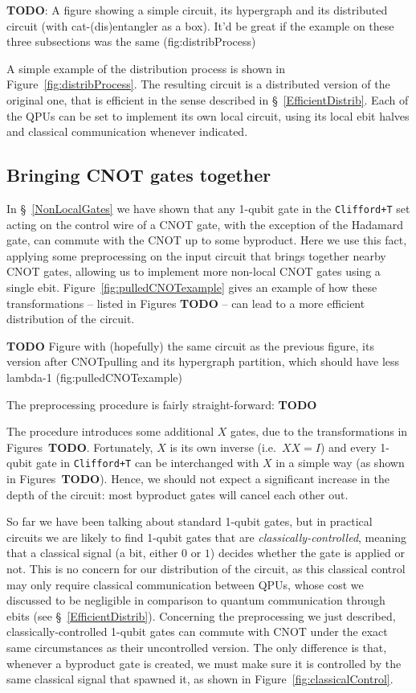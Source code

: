 \textbf{TODO}: A figure showing a simple circuit, its hypergraph and its distributed circuit (with cat-(dis)entangler as a box). It'd be great if the example on these three subsections was the same (fig:distribProcess)

A simple example of the distribution process is shown in Figure~\ref{fig:distribProcess}. The resulting circuit is a distributed version of the original one, that is efficient in the sense described in \S~\ref{EfficientDistrib}. Each of the QPUs can be set to implement its own local circuit, using its local ebit halves and classical communication whenever indicated.


\subsection{Bringing CNOT gates together}

In \S~\ref{NonLocalGates} we have shown that any 1-qubit gate in the \texttt{Clifford+T} set acting on the control wire of a CNOT gate, with the exception of the Hadamard gate, can commute with the CNOT up to some byproduct. Here we use this fact, applying some preprocessing on the input circuit that brings together nearby CNOT gates, allowing us to implement more non-local CNOT gates using a single ebit. Figure~\ref{fig:pulledCNOTexample} gives an example of how these transformations -- listed in Figures \textbf{TODO} -- can lead to a more efficient distribution of the circuit.

\textbf{TODO} Figure with (hopefully) the same circuit as the previous figure, its version after CNOTpulling and its hypergraph partition, which should have less lambda-1 (fig:pulledCNOTexample)

The preprocessing procedure is fairly straight-forward: \textbf{TODO}

The procedure introduces some additional \(X\) gates, due to the transformations in Figures~\textbf{TODO}. Fortunately, \(X\) is its own inverse (i.e.\ \(XX = I\)) and every 1-qubit gate in \texttt{Clifford+T} can be interchanged with \(X\) in a simple way (as shown in Figures~\textbf{TODO}). Hence, we should not expect a significant increase in the depth of the circuit: most byproduct gates will cancel each other out.

So far we have been talking about standard 1-qubit gates, but in practical circuits we are likely to find 1-qubit gates that are \textit{classically-controlled}, meaning that a classical signal (a bit, either \(0\) or \(1\)) decides whether the gate is applied or not. This is no concern for our distribution of the circuit, as this classical control may only require classical communication between QPUs, whose cost we discussed to be negligible in comparison to quantum communication through ebits (see \S~\ref{EfficientDistrib}). Concerning the preprocessing we just described, classically-controlled 1-qubit gates can commute with CNOT under the exact same circumstances as their uncontrolled version. The only difference is that, whenever a byproduct gate is created, we must make sure it is controlled by the same classical signal that spawned it, as shown in Figure~\ref{fig:classicalControl}.

